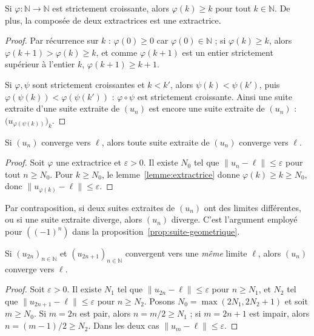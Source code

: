 \begin{lemme}
\label{lemme:extractrice}
Si $\varphi:\mathbb{N}\to\mathbb{N}$ est strictement croissante, alors $\varphi(k)\geq k$ pour tout $k\in\mathbb{N}$. De plus, la composée de deux extractrices est une extractrice.
\end{lemme}

\begin{proof}
Par récurrence sur $k$ : $\varphi(0)\geq 0$ car $\varphi(0)\in\mathbb{N}$ ; si $\varphi(k)\geq k$, alors $\varphi(k+1)>\varphi(k)\geq k$, et comme $\varphi(k+1)$ est un entier strictement supérieur à l'entier $k$, $\varphi(k+1)\geq k+1$.

Si $\varphi,\psi$ sont strictement croissantes et $k<k'$, alors $\psi(k)<\psi(k')$, puis $\varphi(\psi(k))<\varphi(\psi(k'))$ : $\varphi\circ\psi$ est strictement croissante. Ainsi une suite extraite d'une suite extraite de $(u_n)$ est encore une suite extraite de $(u_n)$ : $\big(u_{\varphi(\psi(k))}\big)_k$.
\end{proof}

\begin{prop}
\label{prop:suite-extraite-cv}
Si $(u_n)$ converge vers $\ell$, alors toute suite extraite de $(u_n)$ converge vers $\ell$.
\end{prop}

\begin{proof}
Soit $\varphi$ une extractrice et $\varepsilon>0$. Il existe $N_0$ tel que $\|u_n-\ell\|\leq\varepsilon$ pour tout $n\geq N_0$. Pour $k\geq N_0$, le lemme~\ref{lemme:extractrice} donne $\varphi(k)\geq k\geq N_0$, donc $\|u_{\varphi(k)}-\ell\|\leq\varepsilon$.
\end{proof}

\begin{remarque}
Par contraposition, si deux suites extraites de $(u_n)$ ont des limites différentes, ou si une suite extraite diverge, alors $(u_n)$ diverge. C'est l'argument employé pour $((-1)^n)$ dans la proposition~\ref{prop:suite-geometrique}.
\end{remarque}

\begin{prop}
\label{prop:pairs-impairs}
Si $(u_{2n})_{n\in\mathbb{N}}$ et $(u_{2n+1})_{n\in\mathbb{N}}$ convergent vers une \emph{même} limite $\ell$, alors $(u_n)$ converge vers $\ell$.
\end{prop}

\begin{proof}
Soit $\varepsilon>0$. Il existe $N_1$ tel que $\|u_{2n}-\ell\|\leq\varepsilon$ pour $n\geq N_1$, et $N_2$ tel que $\|u_{2n+1}-\ell\|\leq\varepsilon$ pour $n\geq N_2$. Posons $N_0=\max(2N_1,2N_2+1)$ et soit $m\geq N_0$. Si $m=2n$ est pair, alors $n=m/2\geq N_1$ ; si $m=2n+1$ est impair, alors $n=(m-1)/2\geq N_2$. Dans les deux cas $\|u_m-\ell\|\leq\varepsilon$.
\end{proof}

